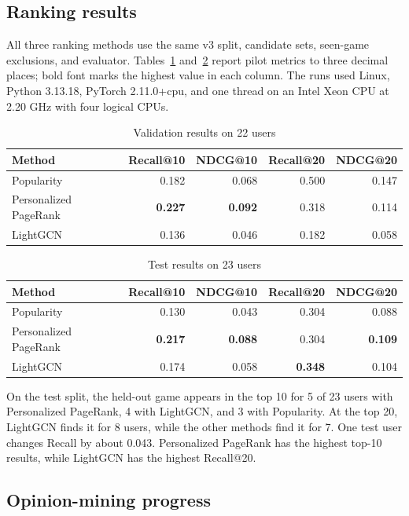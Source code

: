 \documentclass[11pt]{article}
\begin{document}
\subsection{Ranking results}

All three ranking methods use the same v3 split, candidate sets, seen-game exclusions, and evaluator. Tables~\ref{tab:validation} and~\ref{tab:test} report pilot metrics to three decimal places; bold font marks the highest value in each column. The runs used Linux, Python 3.13.18, PyTorch 2.11.0+cpu, and one thread on an Intel Xeon CPU at 2.20 GHz with four logical CPUs.

\begin{table}[ht]
\centering
\small
\caption{Validation results on 22 users}
\label{tab:validation}
\begin{tabular}{lrrrr}
\toprule
Method & Recall@10 & NDCG@10 & Recall@20 & NDCG@20 \\
\midrule
Popularity & 0.182 & 0.068 & 0.500 & 0.147 \\
Personalized PageRank & \textbf{0.227} & \textbf{0.092} & 0.318 & 0.114 \\
LightGCN & 0.136 & 0.046 & 0.182 & 0.058 \\
\bottomrule
\end{tabular}
\end{table}

\begin{table}[ht]
\centering
\small
\caption{Test results on 23 users}
\label{tab:test}
\begin{tabular}{lrrrr}
\toprule
Method & Recall@10 & NDCG@10 & Recall@20 & NDCG@20 \\
\midrule
Popularity & 0.130 & 0.043 & 0.304 & 0.088 \\
Personalized PageRank & \textbf{0.217} & \textbf{0.088} & 0.304 & \textbf{0.109} \\
LightGCN & 0.174 & 0.058 & \textbf{0.348} & 0.104 \\
\bottomrule
\end{tabular}
\end{table}

On the test split, the held-out game appears in the top 10 for 5 of 23 users with Personalized PageRank, 4 with LightGCN, and 3 with Popularity. At the top 20, LightGCN finds it for 8 users, while the other methods find it for 7. One test user changes Recall by about 0.043. Personalized PageRank has the highest top-10 results, while LightGCN has the highest Recall@20.

\subsection{Opinion-mining progress}
\end{document}
